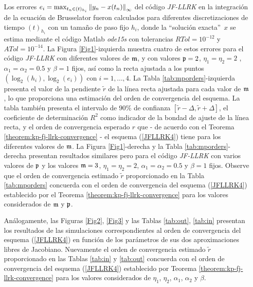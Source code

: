 Los errores $e_i=\max_{t_n\in(t)_{h_i}}\left\lVert y_n-x(t_n) \right\rVert_\infty$ del código \textit{JF-LLRK} en la integración de la ecuación de Brusselator fueron calculados para diferentes discretizaciones de tiempo $(t)_{h_i}$ con un tamaño de paso fijo $h_i$, donde la \textquotedblleft solución exacta\textquotedblright ~$x$ se estima mediante el código Matlab \textit{ode15s} con tolerancias $RTol= 10^{-12}$ y $ATol=10^{-14}$. La Figura \ref{Fig1}-izquierda muestra cuatro de estos errores para el código \textit{JF-LLRK} con diferentes valores de $\mathfrak{m}$, y con valores $\mathfrak{p}=2$, $\eta_1=\eta_2=2$ , $\alpha_1=\alpha_2=0.5$ y $\beta=1$ fijos, así como la recta ajustada a los puntos $(\log_2(h_i),\log_2(e_i))$ con $i=1,. ..,4$. La Tabla \ref{tab:mporders}-izquierda presenta el valor de la pendiente $\widetilde{r}$ de la línea recta ajustada para cada valor de $\mathfrak{m}$, lo que proporciona una estimación del orden de convergencia del esquema. La tabla también presenta el intervalo de $90\%$ de confianza $[\widetilde{r}-\varDelta,\widetilde{r}+\varDelta]$, el coeficiente de determinación $R^2$ como indicador de la bondad de ajuste de la línea recta, y el orden de convergencia esperado $r$ que - de acuerdo con el Teorema \ref {theorem:kp-fj-llrk-convergence} - el esquema (\ref{JFLLRK4}) tiene para los diferentes valores de $\mathfrak{m}$. La Figura \ref{Fig1}-derecha y la Tabla \ref{tab:mporders}-derecha presentan resultados similares pero para el código \textit{JF-LLRK} con varios valores de $\mathfrak{p}$ y los valores $\mathfrak{m}=3$, $\eta_1=\eta_2=2$, $\alpha_1=\alpha_2=0.5$ y $\beta=1$ fijos. Observe que el orden de convergencia estimado $\widetilde{r}$ proporcionado en la Tabla \ref{tab:mporders} concuerda con el orden de convergencia del esquema (\ref{JFLLRK4}) establecido por el Teorema \ref{theorem:kp-fj-llrk-convergence} para los valores considerados de $\mathfrak{m}$ y $\mathfrak{p}$.

Análogamente, las Figuras \ref{Fig2}, \ref{Fig3} y las Tablas \ref{tab:out}, \ref{tab:in} presentan los resultados de las simulaciones correspondientes al orden de convergencia del esquema (\ref{JFLLRK4}) en función de los parámetros de sus dos aproximaciones libres de Jacobiano. Nuevamente el orden de convergencia estimado $\widetilde{r}$ proporcionado en las Tablas \ref{tab:in} y \ref{tab:out} concuerda con el orden de convergencia del esquema (\ref{JFLLRK4}) establecido por Teorema \ref{theorem:kp-fj-llrk-convergence} para los valores considerados de $\eta_1$, $\eta_2$, $\alpha_1$, $\alpha_2$ y $\beta$.



